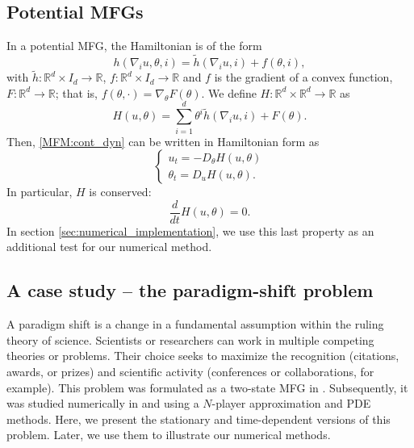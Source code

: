 \documentclass[12pt]{amsart}
\newcommand{\Rr}{{\mathbb{R}}}
\newcommand{\1}{{\chi}}
\theoremstyle{definition}
\begin{document}
        \subsection{Potential MFGs} 
        \label{sub:potential_mean_field_games}
        In a potential MFG, the Hamiltonian is of the form
        \begin{equation*}
        h(\nabla_i u, \theta, i) = \tilde h(\nabla_i u,i) + f(\theta,i),
        \end{equation*}
        with $\tilde h: \Rr^d \times I_d \to \Rr$, $f:\Rr^d \times I_d \to \Rr$ and $f$ is the gradient of a convex function, 
        $F:\Rr^d \to \Rr$; that is,  $f(\theta,\cdot) = \nabla_{\theta}F(\theta)$.
        We define  $H:\Rr^d \times \Rr^d \to \Rr$ as
        \begin{equation}
        \label{hfor}
        H( u, \theta) = \sum_{i=1}^d \theta^i \tilde h(\nabla_{i} u,i) + F(\theta).
        \end{equation}
Then, \eqref{MFM:cont_dyn} can be written in Hamiltonian form as
\[
\begin{cases}
u_t=-D_\theta H(u, \theta)\\
\theta_t=D_u H(u, \theta). 
\end{cases}
\]
In particular,  $H$ is conserved:
\[
\frac{d}{dt}H(u,\theta)=0. 
\]
In section \ref{sec:numerical_implementation}, 
we use this last property as an additional test for our numerical method. 


\subsection{A case study -- the paradigm-shift problem} 
\label{sub:a_case_study_the_paradigm_shift_problem}

        A paradigm shift is a change in a fundamental assumption within the ruling theory of science. 
                Scientists or researchers can work in multiple competing theories or problems. 
        Their choice seeks to maximize the  recognition (citations, awards, or prizes) and scientific activity (conferences or collaborations, for example). 
 This problem was formulated as a two-state MFG in \cite{BesancenotDogguy}. 
                 Subsequently, it was studied numerically in \cite{Gomes:2014kq} and \cite{GVW-dual} using a $N$-player approximation and PDE methods. 
                 Here, we present the stationary and time-dependent versions of this problem. 
       Later,  we use them to illustrate our numerical methods.  
                
\end{document}

